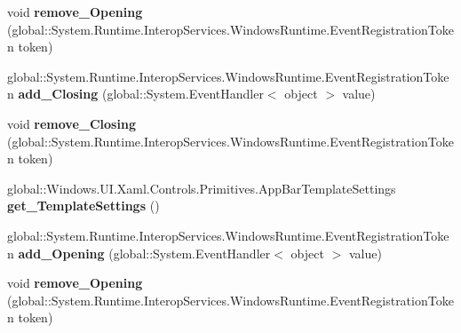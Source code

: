 \begin{DoxyCompactItemize}
\item 
\mbox{\label{interface_windows_1_1_u_i_1_1_xaml_1_1_controls_1_1_i_app_bar3_afaabe37e022a635508e675aa7ef0974c}} 
void {\bfseries remove\+\_\+\+Opening} (global\+::\+System.\+Runtime.\+Interop\+Services.\+Windows\+Runtime.\+Event\+Registration\+Token token)
\item 
\mbox{\label{interface_windows_1_1_u_i_1_1_xaml_1_1_controls_1_1_i_app_bar3_a6e424fac8c7cec71bad623c7c5e8ebd3}} 
global\+::\+System.\+Runtime.\+Interop\+Services.\+Windows\+Runtime.\+Event\+Registration\+Token {\bfseries add\+\_\+\+Closing} (global\+::\+System.\+Event\+Handler$<$ object $>$ value)
\item 
\mbox{\label{interface_windows_1_1_u_i_1_1_xaml_1_1_controls_1_1_i_app_bar3_aac12730dbba64fc7499059fd3646d24d}} 
void {\bfseries remove\+\_\+\+Closing} (global\+::\+System.\+Runtime.\+Interop\+Services.\+Windows\+Runtime.\+Event\+Registration\+Token token)
\item 
\mbox{\label{interface_windows_1_1_u_i_1_1_xaml_1_1_controls_1_1_i_app_bar3_a890144dceae211eb8ad8f8f7a8bea0d8}} 
global\+::\+Windows.\+U\+I.\+Xaml.\+Controls.\+Primitives.\+App\+Bar\+Template\+Settings {\bfseries get\+\_\+\+Template\+Settings} ()
\item 
\mbox{\label{interface_windows_1_1_u_i_1_1_xaml_1_1_controls_1_1_i_app_bar3_a62cddde1b89907b6b31a54a5172b02d5}} 
global\+::\+System.\+Runtime.\+Interop\+Services.\+Windows\+Runtime.\+Event\+Registration\+Token {\bfseries add\+\_\+\+Opening} (global\+::\+System.\+Event\+Handler$<$ object $>$ value)
\item 
\mbox{\label{interface_windows_1_1_u_i_1_1_xaml_1_1_controls_1_1_i_app_bar3_afaabe37e022a635508e675aa7ef0974c}} 
void {\bfseries remove\+\_\+\+Opening} (global\+::\+System.\+Runtime.\+Interop\+Services.\+Windows\+Runtime.\+Event\+Registration\+Token token)
\item 

\end{DoxyCompactItemize}
